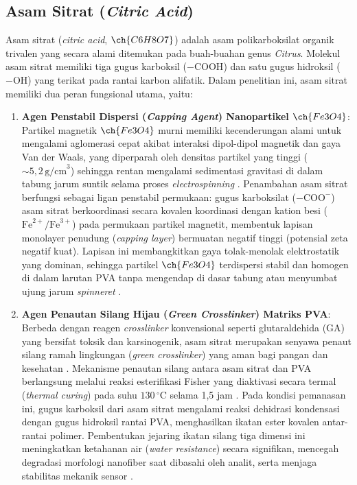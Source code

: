 \subsection{Asam Sitrat (\textit{Citric Acid})}
Asam sitrat (\textit{citric acid}, $\ch{C6H8O7}$) adalah asam polikarboksilat organik trivalen yang secara alami ditemukan pada buah-buahan genus \textit{Citrus}. Molekul asam sitrat memiliki tiga gugus karboksil ($- \text{COOH}$) dan satu gugus hidroksil ($- \text{OH}$) yang terikat pada rantai karbon alifatik. Dalam penelitian ini, asam sitrat memiliki dua peran fungsional utama, yaitu:
\begin{enumerate}
    \item \textbf{Agen Penstabil Dispersi (\textit{Capping Agent}) Nanopartikel $\ch{Fe3O4}$}: Partikel magnetik $\ch{Fe3O4}$ murni memiliki kecenderungan alami untuk mengalami aglomerasi cepat akibat interaksi dipol-dipol magnetik dan gaya Van der Waals, yang diperparah oleh densitas partikel yang tinggi ($\sim 5{,}2\,\text{g/cm}^3$) sehingga rentan mengalami sedimentasi gravitasi di dalam tabung jarum suntik selama proses \textit{electrospinning} \cite{dheyab2020citric}. Penambahan asam sitrat berfungsi sebagai ligan penstabil permukaan: gugus karboksilat ($- \text{COO}^-$) asam sitrat berkoordinasi secara kovalen koordinasi dengan kation besi ($\text{Fe}^{2+}/\text{Fe}^{3+}$) pada permukaan partikel magnetit, membentuk lapisan monolayer penudung (\textit{capping layer}) bermuatan negatif tinggi (potensial zeta negatif kuat). Lapisan ini membangkitkan gaya tolak-menolak elektrostatik yang dominan, sehingga partikel $\ch{Fe3O4}$ terdispersi stabil dan homogen di dalam larutan PVA tanpa mengendap di dasar tabung atau menyumbat ujung jarum \textit{spinneret} \cite{dheyab2020citric}.
    \item \textbf{Agen Penautan Silang Hijau (\textit{Green Crosslinker}) Matriks PVA}: Berbeda dengan reagen \textit{crosslinker} konvensional seperti glutaraldehida (GA) yang bersifat toksik dan karsinogenik, asam sitrat merupakan senyawa penaut silang ramah lingkungan (\textit{green crosslinker}) yang aman bagi pangan dan kesehatan \cite{shi2008citric}. Mekanisme penautan silang antara asam sitrat dan PVA berlangsung melalui reaksi esterifikasi Fisher yang diaktivasi secara termal (\textit{thermal curing}) pada suhu $130\,^{\circ}\text{C}$ selama 1,5 jam \cite{birck2014citric}. Pada kondisi pemanasan ini, gugus karboksil dari asam sitrat mengalami reaksi dehidrasi kondensasi dengan gugus hidroksil rantai PVA, menghasilkan ikatan ester kovalen antar-rantai polimer. Pembentukan jejaring ikatan silang tiga dimensi ini meningkatkan ketahanan air (\textit{water resistance}) secara signifikan, mencegah degradasi morfologi nanofiber saat dibasahi oleh analit, serta menjaga stabilitas mekanik sensor \cite{shi2008citric,birck2014citric}.
\end{enumerate}

